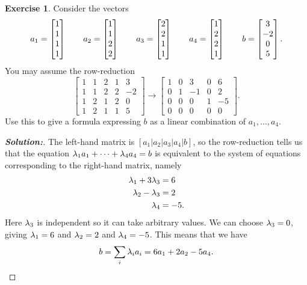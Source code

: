 \documentclass[a4paper]{amsart}
\theoremstyle{definition}
\newtheorem{exercise}{Exercise}
\newenvironment{solution}{\begin{proof}[\textbf{Solution:}] \vphantom{u}}{\end{proof}}
\begin{document}
\begin{exercise}\label{ex-combination-iii}
 Consider the vectors
 \[
  a_1 = \left[\begin{matrix} 1 \\  1 \\ 1 \\ 1 \end{matrix}\right] \qquad
  a_2 = \left[\begin{matrix} 1 \\  1 \\ 2 \\ 2 \end{matrix}\right] \qquad
  a_3 = \left[\begin{matrix} 2 \\  2 \\ 1 \\ 1 \end{matrix}\right] \qquad
  a_4 = \left[\begin{matrix} 1 \\  2 \\ 2 \\ 1 \end{matrix}\right] \qquad
  b   = \left[\begin{matrix} 3 \\ -2 \\ 0 \\ 5 \end{matrix}\right].
 \]
 You may assume the row-reduction
 \[ 
  \left[\begin{array}{cccc|c}
   1 & 1 & 2 & 1 &  3 \\
   1 & 1 & 2 & 2 & -2 \\
   1 & 2 & 1 & 2 &  0 \\
   1 & 2 & 1 & 1 &  5
  \end{array}\right]
  \to 
  \left[\begin{array}{cccc|c}
   1 & 0 &  3 & 0 &  6 \\
   0 & 1 & -1 & 0 &  2 \\
   0 & 0 &  0 & 1 & -5 \\
   0 & 0 &  0 & 0 &  0 
  \end{array}\right].
 \]
 Use this to give a formula expressing $b$ as a linear combination of
 $a_1,\dotsc,a_4$. 
\end{exercise}
\begin{solution}
 The left-hand matrix is $[a_1|a_2|a_3|a_4|b]$, so the row-reduction
 tells us that the equation $\lambda_1a_1+\dotsb+\lambda_4a_4=b$ is equivalent
 to the system of equations corresponding to the right-hand matrix,
 namely 
 \begin{align*}
  \lambda_1+3\lambda_3 &= 6 \\
  \lambda_2-\lambda_3  &= 2 \\
  \lambda_4        &= -5.
 \end{align*}
 Here $\lambda_3$ is independent so it can take arbitrary values.  We can
 choose $\lambda_3=0$, giving $\lambda_1=6$ and $\lambda_2=2$ and $\lambda_4=-5$.
 This means that we have
 \[ b = \sum_i\lambda_ia_i = 6a_1+2a_2-5a_4. \]
\end{solution}
\end{document}
